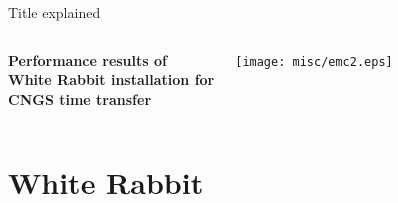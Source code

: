 \documentclass[compress,red]{beamer}
\begin{document}
\begin{frame}{Title explained}

\begin{columns}[c]
    \begin{center}
	\textbf{Performance results of \\White Rabbit installation for \\CNGS time transfer}
    \end{center}
    \begin{center}
      \texttt{[image: misc/emc2.eps]}
    \end{center}
\end{columns}

\end{frame}
\section{White Rabbit}
\end{document}
